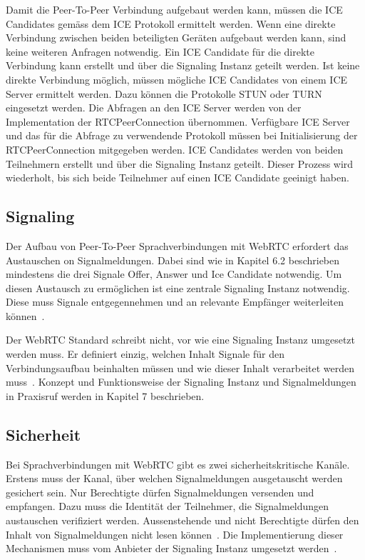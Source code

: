 Damit die Peer-To-Peer Verbindung aufgebaut werden kann, müssen die ICE Candidates gemäss dem ICE Protokoll ermittelt werden.
Wenn eine direkte Verbindung zwischen beiden beteiligten Geräten aufgebaut werden kann, sind keine weiteren Anfragen notwendig.
Ein ICE Candidate für die direkte Verbindung kann erstellt und über die Signaling Instanz geteilt werden.
Ist keine direkte Verbindung möglich, müssen mögliche ICE Candidates von einem ICE Server ermittelt werden.
Dazu können die Protokolle STUN oder TURN eingesetzt werden.
Die Abfragen an den ICE Server werden von der Implementation der RTCPeerConnection übernommen.
Verfügbare ICE Server und das für die Abfrage zu verwendende Protokoll müssen bei Initialisierung der RTCPeerConnection mitgegeben werden.
ICE Candidates werden von beiden Teilnehmern erstellt und über die Signaling Instanz geteilt.
Dieser Prozess wird wiederholt, bis sich beide Teilnehmer auf einen ICE Candidate geeinigt haben.

\subsection{Signaling}

Der Aufbau von Peer-To-Peer Sprachverbindungen mit WebRTC erfordert das Austauschen on Signalmeldungen.
Dabei sind wie in Kapitel 6.2 beschrieben mindestens die drei Signale Offer, Answer und Ice Candidate notwendig.
Um diesen Austausch zu ermöglichen ist eine zentrale Signaling Instanz notwendig.
Diese muss Signale entgegennehmen und an relevante Empfänger weiterleiten können~\cite{webrtc_spec}.

Der WebRTC Standard schreibt nicht, vor wie eine Signaling Instanz umgesetzt werden muss.
Er definiert einzig, welchen Inhalt Signale für den Verbindungsaufbau beinhalten müssen und wie dieser Inhalt verarbeitet werden muss~\cite{webrtc_spec}.
Konzept und Funktionsweise der Signaling Instanz und Signalmeldungen in Praxisruf werden in Kapitel 7 beschrieben.

\subsection{Sicherheit}

Bei Sprachverbindungen mit WebRTC gibt es zwei sicherheitskritische Kanäle.
Erstens muss der Kanal, über welchen Signalmeldungen ausgetauscht werden gesichert sein.
Nur Berechtigte dürfen Signalmeldungen versenden und empfangen.
Dazu muss die Identität der Teilnehmer, die Signalmeldungen austauschen verifiziert werden.
Aussenstehende und nicht Berechtigte dürfen den Inhalt von Signalmeldungen nicht lesen können~\cite{rfc_8827_webRTC_SecurityArchitecture}.
Die Implementierung dieser Mechanismen muss vom Anbieter der Signaling Instanz umgesetzt werden~\cite{webrtc_spec}.

